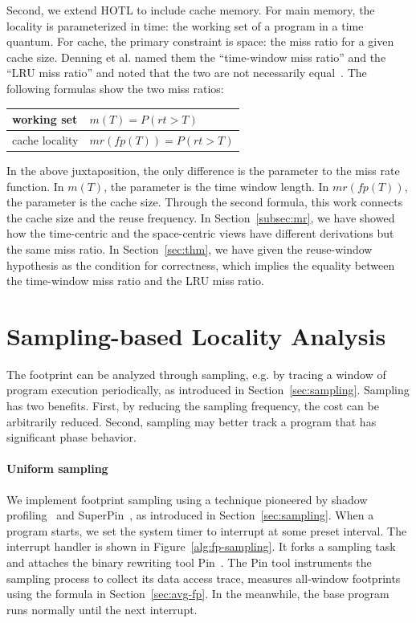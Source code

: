 Second, we extend HOTL to include cache memory. For main memory, the
locality is parameterized in time: the working set of a program in a
time quantum.  For cache, the primary constraint is space: the miss
ratio for a given cache size.  Denning et al. named them the
``time-window miss ratio'' and the ``LRU miss ratio'' and noted that
the two are not necessarily
equal~\cite{DenningS:CACM72,DenningS:CACM78}.  The following formulas
show the two miss ratios: 

\medskip
\begin{tabular}{l|l}
working set & $m( T ) = P(rt>T)$ \\ \hline
cache locality &  $mr( fp(T) ) = P(rt>T)$
\end{tabular}
\medskip

In the above juxtaposition, the only difference is the parameter to
the miss rate function.  In $m(T)$, the parameter is the time window length.  In
$mr( fp(T) )$, the parameter is the cache size.  Through the second
formula, this work connects the cache size and the reuse frequency.  In
Section~\ref{subsec:mr}, we have showed how the time-centric and the
space-centric views have different derivations but the same miss
ratio.  In Section~\ref{sec:thm}, we have given the reuse-window
hypothesis as the condition for correctness, which implies the
equality between the time-window miss ratio and the LRU miss ratio.

\section{Sampling-based Locality Analysis}
\label{sec:sampling-phase}

The footprint can be analyzed through sampling, e.g. by
tracing a window of program execution periodically, as introduced in
Section~\ref{sec:sampling}. Sampling has two benefits.  First, by
reducing the sampling frequency, the cost can be arbitrarily reduced.
Second, sampling may better track a program that has significant phase behavior.

\paragraph{Uniform sampling} 
We implement footprint sampling using a technique pioneered by shadow
profiling~\cite{Moseley+:CGO07} and SuperPin~\cite{WallaceH:CGO07}, as introduced in Section~\ref{sec:sampling}.  When a program
starts, we set the system timer to interrupt at some preset interval.
The interrupt handler is shown in Figure~\ref{alg:fp-sampling}.  It forks
a sampling task and attaches the binary rewriting tool
Pin~\cite{Pin:PLDI05}.  The Pin tool instruments the sampling process
to collect its data access trace, measures all-window footprints using
the formula in Section~\ref{sec:avg-fp}.  In the meanwhile, the
base program runs normally until the next interrupt.

